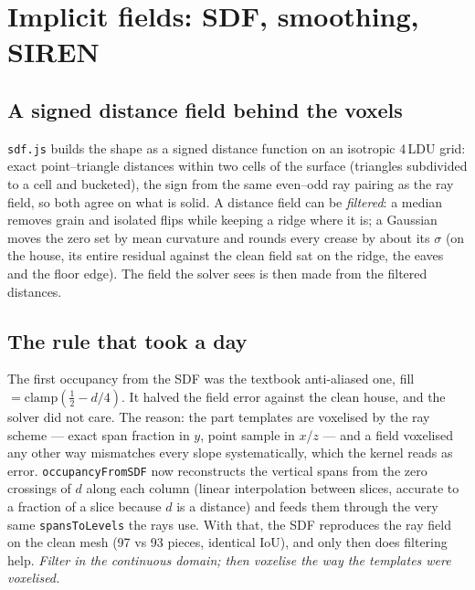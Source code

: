 \documentclass[10pt,a4paper]{article}
\newcommand{\code}[1]{\texttt{\small #1}}
\newcommand{\ldu}{\,LDU}
\begin{document}
\section{Implicit fields: SDF, smoothing, SIREN}\label{sec:sdf}
\subsection{A signed distance field behind the voxels}
\code{sdf.js} builds the shape as a signed distance function on an isotropic 4\ldu{} grid: exact point--triangle distances within
two cells of the surface (triangles subdivided to a cell and bucketed), the sign from the same even--odd ray pairing as the ray field,
so both agree on what is solid. A distance field can be \emph{filtered}: a median removes grain and isolated flips while keeping a
ridge where it is; a Gaussian moves the zero set by mean curvature and rounds every crease by about its $\sigma$ (on the house,
its entire residual against the clean field sat on the ridge, the eaves and the floor edge). The field the solver sees is then
made from the filtered distances.

\subsection{The rule that took a day}
The first occupancy from the SDF was the textbook anti-aliased one, fill $=\mathrm{clamp}(\tfrac12-d/4)$. It halved the field error
against the clean house, and the solver did not care. The reason: the part templates are voxelised by the ray scheme --- exact
span fraction in $y$, point sample in $x$/$z$ --- and a field voxelised any other way mismatches every slope systematically, which
the kernel reads as error. \code{occupancyFromSDF} now reconstructs the vertical spans from the zero crossings of $d$ along each
column (linear interpolation between slices, accurate to a fraction of a slice because $d$ is a distance) and feeds them through the
very same \code{spansToLevels} the rays use. With that, the SDF reproduces the ray field on the clean mesh (97 vs 93 pieces,
identical IoU), and only then does filtering help. \emph{Filter in the continuous domain; then voxelise the way the templates
were voxelised.}
\end{document}
